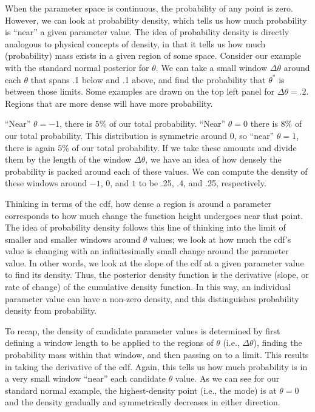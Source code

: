 \documentclass[man]{apa}
\begin{document}
When the parameter space is continuous, the probability of any point is zero. However, we can look at probability density, which tells us how much probability is ``near'' a given parameter value. The idea of probability density is directly analogous to physical concepts of density, in that it tells us how much (probability) mass exists in a given region of some space. Consider our example with the standard normal posterior for $\theta$. We can take a small window $\Delta \theta$ around each $\theta$ that spans .1 below and .1 above, and find the probability that $\theta^*$ is between those limits. Some examples are drawn on the top left panel for $\Delta\theta=.2$. Regions that are more dense will have more probability.

``Near'' $\theta=-1$, there is $5\%$ of our total probability. ``Near'' $\theta=0$ there is $8\%$ of our total probability. This distribution is symmetric around 0, so ``near'' $\theta=1$, there is again $5\%$ of our total probability. If we take these amounts and divide them by the length of the window $\Delta \theta$, we have an idea of how densely the probability is packed around each of these values. We can compute the density of these windows around  $-1$, 0, and $1$ to be .25, .4, and .25, respectively. 

Thinking in terms of the cdf, how dense a region is around a parameter corresponds to how much change the function height undergoes near that point. The idea of probability density follows this line of thinking into the limit of smaller and smaller windows around $\theta$ values; we look at how much the cdf's value is changing with an infinitesimally small change around the parameter value. In other words, we look at the slope of the cdf at a given parameter value to find its density. Thus, the posterior density function is the derivative (slope, or rate of change) of the cumulative density function. In this way, an individual parameter value can have a non-zero density, and this distinguishes probability density from probability.

To recap, the density of candidate parameter values is determined by first defining a window length to be applied to the regions of $\theta$ (i.e., $\Delta\theta$), finding the probability mass within that window, and then passing on to a limit. This results in taking the derivative of the cdf. Again, this tells us how much probability is in a very small window ``near'' each candidate $\theta$ value. As we can see for our standard normal example, the highest-density point (i.e., the mode) is at $\theta=0$ and the density gradually and symmetrically decreases in either direction.
\end{document}
